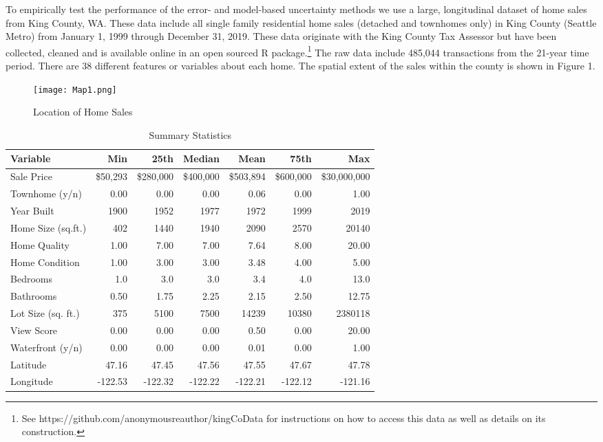 \documentclass[colTwo]{anon}
\theoremstyle{definition}
\begin{document}
To empirically test the performance of the error- and model-based uncertainty methods we use a large, longitudinal dataset of home sales from King County, WA.  These data include all single family residential home sales (detached and townhomes only) in King County (Seattle Metro) from January 1, 1999 through December 31, 2019. These data originate with the King County Tax Assessor but have been collected, cleaned and is available online in an open sourced R package.\footnote{See https://github.com/anonymousreauthor/kingCoData for instructions on how to access this data as well as details on its construction.} The raw data include 485,044 transactions from the 21-year time period.  There are 38 different features or variables about each home. The spatial extent of the sales within the county is shown in Figure 1.

\begin{figure*}[h!]
\centering
\texttt{[image: Map1.png]}
\caption{Location of Home Sales}
\label{fig:calibsens}
\end{figure*}

\begin{table*}[h!]
\centering
\begin{tabular}{l|r|r|r|r|r|r}
\hline
\textbf{Variable} & \textbf{Min} & \textbf{25th} & \textbf{Median} & \textbf{Mean} & \textbf{75th} & \textbf{Max}\\
\hline
Sale Price & \$50,293 & \$280,000 & \$400,000 & \$503,894 & \$600,000 & \$30,000,000\\
Townhome (y/n) & 0.00 & 0.00 & 0.00 & 0.06 & 0.00 & 1.00 \\
Year Built & 1900 & 1952 & 1977 & 1972 & 1999 & 2019\\
Home Size (sq.ft.) & 402 & 1440 & 1940 & 2090 & 2570 & 20140\\
Home Quality & 1.00 & 7.00 & 7.00 & 7.64 & 8.00 & 20.00\\
Home Condition & 1.00 & 3.00 & 3.00 & 3.48 & 4.00 & 5.00\\
Bedrooms & 1.0 & 3.0 & 3.0 & 3.4 & 4.0 & 13.0\\
Bathrooms & 0.50 & 1.75 & 2.25 & 2.15 & 2.50 & 12.75\\
Lot Size (sq. ft.) & 375 & 5100 & 7500 & 14239 & 10380 & 2380118\\
View Score & 0.00 & 0.00 & 0.00 & 0.50 & 0.00 & 20.00\\
Waterfront (y/n) & 0.00 & 0.00 & 0.00 & 0.01 & 0.00 & 1.00\\
Latitude & 47.16 & 47.45 & 47.56 & 47.55 & 47.67 & 47.78\\
Longitude & -122.53 & -122.32 & -122.22 & -122.21 & -122.12 & -121.16\\
\hline
\end{tabular}
\caption{Summary Statistics}
\label{table:3}
\end{table*}
\end{document}
